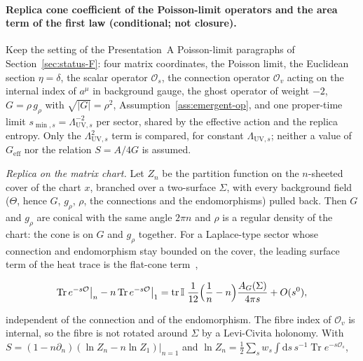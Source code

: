 \paragraph{Replica cone coefficient of the Poisson-limit operators and the area term of the first law (conditional; not closure).} \label{detail:sec-B-paragraphreplicaconecoefficien-3}

Keep the setting of the Presentation~A Poisson-limit paragraphs of Section~\ref{sec:status-F}: four matrix coordinates, the Poisson limit, the Euclidean section \(\eta=\delta\), the scalar operator \(\mathcal O_s\), the connection operator \(\mathcal O_v\) acting on the internal index of \(a^\mu\) in background gauge, the ghost operator of weight \(-2\), \(G=\rho\,g_\rho\) with \(\sqrt{|G|}=\rho^2\), Assumption~\ref{ass:emergent-op}, and one proper-time limit \(s_{\min,s}=\Lambda_{\mathrm{UV},s}^{-2}\) per sector, shared by the effective action and the replica entropy. Only the \(\Lambda_{\mathrm{UV},s}^2\) term is compared, for constant \(\Lambda_{\mathrm{UV},s}\); neither a value of \(G_{\mathrm{eff}}\) nor the relation \(S=A/4G\) is assumed.



\emph{Replica on the matrix chart.} Let \(Z_n\) be the partition function on the \(n\)-sheeted cover of the chart \(x\), branched over a two-surface \(\Sigma\), with every background field (\(\Theta\), hence \(G\), \(g_\rho\), \(\rho\), the connections and the endomorphisms) pulled back. Then \(G\) and \(g_\rho\) are conical with the same angle \(2\pi n\) and \(\rho\) is a regular density of the chart: the cone is on \(G\) and \(g_\rho\) together. For a Laplace-type sector whose connection and endomorphism stay bounded on the cover, the leading surface term of the heat trace is the flat-cone term~\cite{Solodukhin2011},

\[

  \operatorname{Tr}e^{-s\mathcal O}\big|_n-n\operatorname{Tr}e^{-s\mathcal O}\big|_1

  =\operatorname{tr}\mathbb I\;\frac1{12}\Bigl(\frac1n-n\Bigr)\frac{A_G(\Sigma)}{4\pi s}+O(s^0),

\]

independent of the connection and of the endomorphism. The fibre index of \(\mathcal O_v\) is internal, so the fibre is not rotated around \(\Sigma\) by a Levi-Civita holonomy. With \(S=(1-n\partial_n)(\ln Z_n-n\ln Z_1)|_{n=1}\) and \(\ln Z_n=\tfrac12\sum_sw_s\int\mathrm{d}s\,s^{-1}\operatorname{Tr}e^{-s\mathcal O_s}\),

